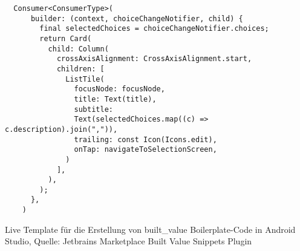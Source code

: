 \begin{listing}[h]
    \begin{verbatim}
  Consumer<ConsumerType>(
      builder: (context, choiceChangeNotifier, child) {
        final selectedChoices = choiceChangeNotifier.choices;
        return Card(
          child: Column(
            crossAxisAlignment: CrossAxisAlignment.start,
            children: [
              ListTile(
                focusNode: focusNode,
                title: Text(title),
                subtitle:
                Text(selectedChoices.map((c) => c.description).join(",")),
                trailing: const Icon(Icons.edit),
                onTap: navigateToSelectionScreen,
              )
            ],
          ),
        );
      },
    )
\end{verbatim} 
\caption[built_value Live Template]{Live Template für die Erstellung von built_value Boilerplate-Code in Android Studio, Quelle: Jetbrains Marketplace Built Value Snippets Plugin}
\label{lst:BuiltValueLiveTemplate}
\end{listing}
